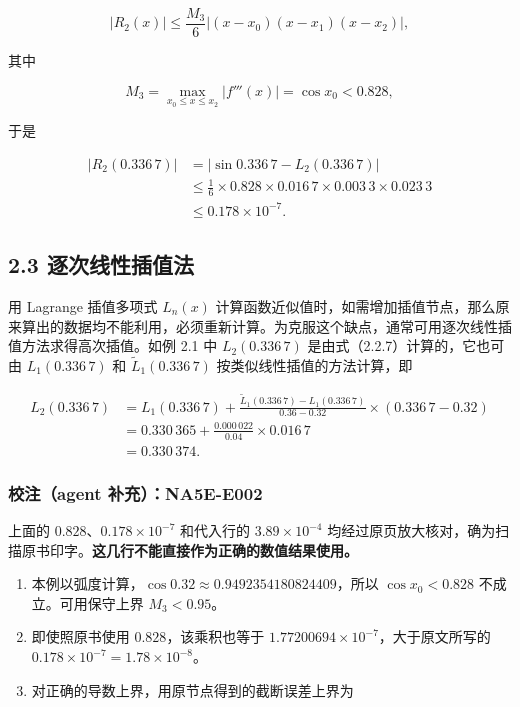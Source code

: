 \[
|R_2(x)|\le\frac{M_3}{6}|(x-x_0)(x-x_1)(x-x_2)|,
\]

其中

\[
M_3=\max_{x_0\le x\le x_2}|f'''(x)|=\cos x_0<0.828,
\]

于是

\[
\begin{aligned}
|R_2(0.336\,7)|
&=|\sin0.336\,7-L_2(0.336\,7)|\\
&\le\frac16\times0.828\times0.016\,7\times0.003\,3\times0.023\,3\\
&\le0.178\times10^{-7}.
\end{aligned}
\]

\subsection{2.3 逐次线性插值法}\label{ch02a-ux9010ux6b21ux7ebfux6027ux63d2ux503cux6cd5}

用 Lagrange 插值多项式 \(L_n(x)\) 计算函数近似值时，如需增加插值节点，那么原来算出的数据均不能利用，必须重新计算。为克服这个缺点，通常可用逐次线性插值方法求得高次插值。如例 2.1 中 \(L_2(0.336\,7)\) 是由式（2.2.7）计算的，它也可由 \(L_1(0.336\,7)\) 和 \(\widetilde L_1(0.336\,7)\) 按类似线性插值的方法计算，即

\[
\begin{aligned}
L_2(0.336\,7)
&=L_1(0.336\,7)
+\frac{\widetilde L_1(0.336\,7)-L_1(0.336\,7)}{0.36-0.32}
\times(0.336\,7-0.32)\\
&=0.330\,365+\frac{0.000\,022}{0.04}\times0.016\,7\\
&=0.330\,374.
\end{aligned}
\]

\subsubsection{校注（agent 补充）：NA5E-E002}\label{ch02a-ux6821ux6ce8agent-ux8865ux5145na5e-e002}

上面的 \(0.828\)、\(0.178\times10^{-7}\) 和代入行的 \(3.89\times10^{-4}\) 均经过原页放大核对，确为扫描原书印字。\textbf{这几行不能直接作为正确的数值结果使用。}

\begin{enumerate}
\def\labelenumi{\arabic{enumi}.}
\tightlist
\item
  本例以弧度计算，\(\cos0.32\approx0.9492354180824409\)，所以 \(\cos x_0<0.828\) 不成立。可用保守上界 \(M_3<0.95\)。
\item
  即使照原书使用 \(0.828\)，该乘积也等于 \(1.77200694\times10^{-7}\)，大于原文所写的 \(0.178\times10^{-7}=1.78\times10^{-8}\)。
\item
  对正确的导数上界，用原节点得到的截断误差上界为
\end{enumerate}

